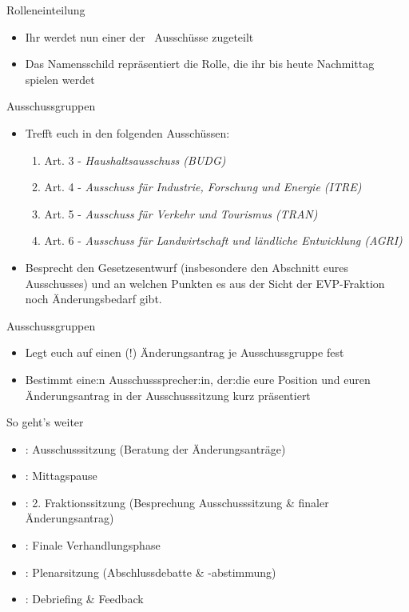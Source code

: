 \documentclass{beamer}
\newcommand{\Fraktionskuerzel}{EVP}
\newcommand{\Fraktionskuerzel}{S\&D}
\newcommand{\Fraktionskuerzel}{Renew}
\newcommand{\Fraktionskuerzel}{Grüne/EFA}
\newcommand{\Fraktionskuerzel}{PfE}
\newcommand{\Fraktionskuerzel}{GUE/NGL}
\newcommand{\ausschussgruppen}{
        			\item Art. 3 - \textit{Haushaltsausschuss (BUDG)}
       		    \item Art. 4 - \textit{Ausschuss für Industrie, Forschung und Energie (ITRE)}
      		    \item Art. 5 - \textit{Ausschuss für Verkehr und Tourismus (TRAN)}
      		    \item Art. 6 - \textit{Ausschuss für Landwirtschaft und ländliche Entwicklung (AGRI)}
	    }
\newcommand{\ausschussgruppen}{
                	\item Art. 3 - \textit{Haushaltsausschuss (BUDG)}
				\item Art. 4 - \textit{Ausschuss für Beschäftigung und soziale Angelegenheiten (EMPL)}
                	\item Art. 5 - \textit{Unterausschuss für Menschenrechte (DROI)}
				\item Art. 6 - \textit{Ausschuss für bürgerliche Freiheiten, Justiz und Inneres (LIBE)}
    		}
\newcommand{\ausschussgruppen}{
            		\item Finanzierung - \newline \textit{Haushaltsausschuss (BUDG)}
	            	\item Dienstrecht - \newline \textit{Ausschuss für bürgerliche Freiheiten, Justiz und Inneres (LIBE)}
    		        \item Gegenstand und Ziele - \textit{Ausschuss für Sicherheit und Verteidigung (SEDE)}
	    	}
\begin{document}
\begin{frame}{Rolleneinteilung}
\vspace{-1.5cm}
\begin{itemize}
	\item Ihr werdet nun einer der \anzahlcomm\ Ausschüsse zugeteilt
	\item Das Namensschild repräsentiert die Rolle, die ihr bis heute Nachmittag spielen werdet
\end{itemize}
\end{frame}

\begin{frame}{Ausschussgruppen}
\vspace{-1cm}
\begin{itemize}
    \item Trefft euch in den folgenden Ausschüssen:
	\begin{enumerate}
		\ausschussgruppen
	\end{enumerate}	    
    \item Besprecht den Gesetzesentwurf (insbesondere den Abschnitt eures Ausschusses) und an welchen Punkten es aus der Sicht der \Fraktionskuerzel -Fraktion noch Änderungsbedarf gibt.
\end{itemize}
\end{frame}


\begin{frame}{Ausschussgruppen}
\vspace{-1.5cm}
\begin{itemize}
    \item Legt euch auf einen (!) Änderungsantrag je Ausschussgruppe fest
    \item Bestimmt eine:n Ausschusssprecher:in, der:die eure Position und euren Änderungsantrag in der Ausschusssitzung kurz präsentiert
\end{itemize}
\end{frame}


\begin{frame}{So geht's weiter}
\vspace{-1.5cm}
\begin{itemize}
    \item \timeAuss: Ausschusssitzung \newline (Beratung der Änderungsanträge)
    \item \timeMittag: Mittagspause
    \item \timeFrakTwo: 2. Fraktionssitzung (Besprechung Ausschusssitzung \& finaler Änderungsantrag)
    \item \timeFinVerh: Finale Verhandlungsphase
    \item \timePlenar: Plenarsitzung \newline (Abschlussdebatte \& -abstimmung)
    \item \timeDebr: Debriefing \& Feedback
\end{itemize}
\end{frame}
\end{document}
